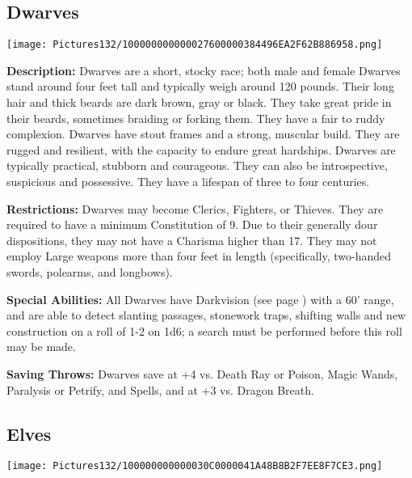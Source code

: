 \documentclass[a4paper,twoside,openany,10pt]{book}
\begin{document}
\begin{multicols}{2}
	

\subsection{Dwarves}\label{dwarves}

\begin{center}
	\texttt{[image: Pictures132/100000000000027600000384496EA2F62B886958.png]}
\end{center}

\textbf{Description: } Dwarves are a short, stocky race; both male and female Dwarves stand around four feet tall and typically weigh around 120 pounds. Their long hair and thick beards are dark brown, gray or black. They take great pride in their beards, sometimes braiding or forking them. They have a fair to ruddy complexion. Dwarves have stout frames and a strong, muscular build. They are rugged and resilient, with the capacity to endure great hardships. Dwarves are typically practical, stubborn and courageous. They can also be introspective, suspicious and possessive. They have a lifespan of three to four centuries.

\textbf{Restrictions: } Dwarves may become Clerics, Fighters, or Thieves. They are required to have a minimum Constitution of 9. Due to their generally dour dispositions, they may not have a Charisma higher than 17. They may not employ Large weapons more than four feet in length (specifically, two-handed swords, polearms, and longbows).

\textbf{Special Abilities:} All Dwarves have Darkvision (see page \hyperlink{darkvision}{\pageref{darkvision}}) with a 60'{} range, and are able to detect slanting passages, stonework traps, shifting walls and new construction on a roll of 1-2 on 1d6; a search must be performed before this roll may be made.

\textbf{Saving Throws: } Dwarves save at +4 vs. Death Ray or Poison, Magic Wands, Paralysis or Petrify, and Spells, and at +3 vs. Dragon Breath.

\columnbreak

\subsection{Elves}\label{elves}

\begin{center}
	\texttt{[image: Pictures132/100000000000030C0000041A48B8B2F7EE8F7CE3.png]}
\end{center}


\end{multicols}
\end{document}
